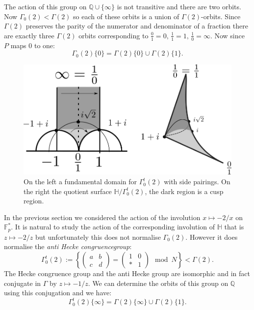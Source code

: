 \documentclass[12pt,a4paper]{amsart}
\def\HH{\mathbb{H}}
\def\g2{\Gamma(2)}
\def\ah{\Gamma_0^t(2)}
\def\oot{\HH / \ah}
\def\QQ{\mathbb{Q}}
\begin{document}
The action of this group on $\mathbb{Q}\cup \{\infty\}$ is not
transitive and there are two orbits.
Now $\Gamma_0(2) < \Gamma(2)$ so each of these orbits is a union of
$\Gamma(2)$-orbits.
Since $\Gamma(2)$ preserves the parity of the numerator and
denominator of a fraction there are exactly three $\Gamma(2)$ orbits
corresponding to $\frac{0}{1} = 0,\, \frac{1}{1} = 1, \,
\frac{1}{0}=\infty$.
Now since $P$ maps $0$ to one:
$$\Gamma_0(2) \{0\} =   \Gamma(2) \{0\} \cup \Gamma(2) \{1\}.$$

 \begin{figure}[ht]
\begin{center}
\includegraphics[scale=.5]{hecke_fund_dom.png} 
\end{center}
\caption{On the left a fundamental domain for $\ah$ with side
pairings.  On the right the quotient surface $\oot$, the dark region
is a cusp region.}
\label{fund}
\end{figure}

In the previous section we considered the action of the involution
$x\mapsto -2/x$ on $\mathbb{F}_{p}^*$. It is natural to study the
action of the corresponding involution of $\mathbb{H}$ that is
$z\mapsto -2/z$ but unfortunately this does not normalise
$\Gamma_0(2)$. 
However it does normalise the \textit{anti Hecke congruencegroup}:
$$ \ah := \left \{ \begin{pmatrix} a & b \\ c & d \end{pmatrix} = 
\begin{pmatrix} 1 & 0 \\ * & 1 \end{pmatrix} \mod N \right \} < \g2.$$
The Hecke congruence group and the anti Hecke group are isomorphic
and in fact conjugate in $\Gamma$ by $z\mapsto -1/z$.
We can determine the orbits of this group on $\QQ$ using this
conjugation and we have:
$$\ah \{\infty\} =   \Gamma(2) \{\infty\} \cup \Gamma(2) \{1\}.$$
\end{document}
